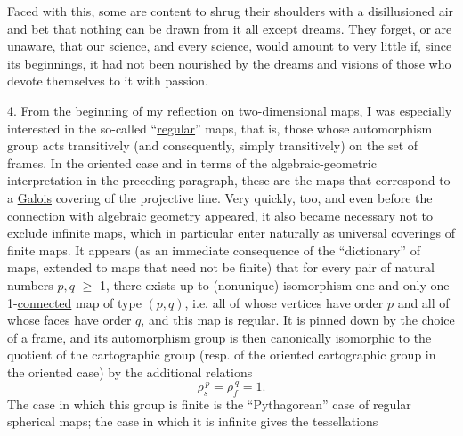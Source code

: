 
Faced with this, some are content to shrug their shoulders
with a disillusioned air and bet that nothing can be drawn
from it all except dreams. They forget, or are unaware,
that our science, and every science, would amount to very little
if, since its beginnings, it had not been nourished by the dreams and visions
of those who devote themselves to it with passion.

4.        From the beginning of my reflection on two-dimensional maps,
I was especially interested in the so-called
``\uline{regular}'' maps, that is, those whose automorphism group
acts transitively (and consequently, simply transitively)
on the set of frames. In the oriented case and in terms of
the algebraic-geometric interpretation in the preceding paragraph,
these are the maps that correspond to a \uline{Galois} covering of
the projective line. Very quickly, too, and even before the connection
with algebraic geometry appeared, it also became
necessary not to exclude infinite maps, which in particular enter
naturally as universal coverings of
finite maps. It appears (as an immediate consequence of the ``dictionary''
of maps, extended to maps that need not be finite)
that for every pair of natural numbers $p, q$ $\geq$ 1, there exists up to
(nonunique) isomorphism one and only one 1-\uline{connected} map
of type $(p,q)$, i.e. all of whose vertices have order $p$
and all of whose faces have order $q$, and this map is regular.
It is pinned down by the choice of a frame, and its
automorphism group is then canonically isomorphic to the quotient
of the cartographic group (resp. of the oriented cartographic
group in the oriented case) by the additional relations
\[ \rho_s^{\,p} = \rho_f^{\,q} = 1. \]
The case in which this group is finite is the ``Pythagorean'' case of
regular spherical maps; the case in which it is infinite gives the tessellations


